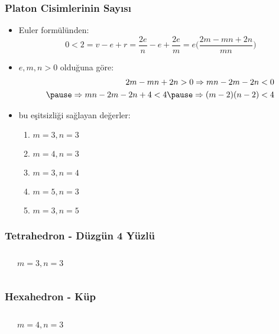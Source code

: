 \documentclass[dvipsnames]{beamer}
\theoremstyle{definition}
\theoremstyle{example}
\theoremstyle{plain}
\begin{document}
\begin{frame}
  \frametitle{Platon Cisimlerinin Sayısı}

    \begin{itemize}
      \item Euler formülünden:
      \[
        0 < 2 = v - e + r = \frac{2e}{n} - e + \frac{2e}{m}
        = e \Big( \frac{2m-mn+2n}{mn} \Big)
      \]

      \pause
      \item $e,m,n > 0$ olduğuna göre:
      \begin{eqnarray*}
        2m - mn + 2n > 0 \Rightarrow mn - 2m -2n < 0 \\\pause
        \Rightarrow mn - 2m - 2n + 4 < 4 \pause \Rightarrow (m - 2)(n - 2) < 4
      \end{eqnarray*}

      \pause
      \item bu eşitsizliği sağlayan değerler:
      \begin{enumerate}
        \item $m=3, n=3$
        \item $m=4, n=3$
        \item $m=3, n=4$
        \item $m=5, n=3$
        \item $m=3, n=5$
      \end{enumerate}
    \end{itemize}
\end{frame}

\begin{frame}
  \frametitle{Tetrahedron - Düzgün 4 Yüzlü}

  \begin{columns}
    \begin{center}
    \end{center}

    \begin{center}

      $m=3, n=3$
    \end{center}
  \end{columns}
\end{frame}

\begin{frame}
  \frametitle{Hexahedron - Küp}

  \begin{columns}
    \begin{center}
    \end{center}

    \begin{center}

      $m=4, n=3$
    \end{center}
  \end{columns}
\end{frame}
\end{document}
